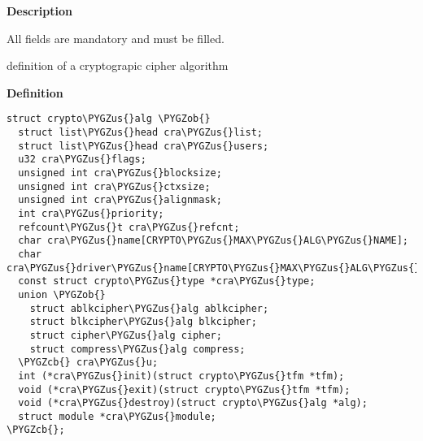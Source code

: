 \documentclass[a4paper,8pt,english]{sphinxmanual}
\def\PYGZus{\char`\_}
\def\PYGZob{\char`\{}
\def\PYGZcb{\char`\}}
\begin{document}
\textbf{Description}

All fields are mandatory and must be filled.

\begin{fulllineitems}
\label{crypto/api-skcipher:c.crypto_alg}
definition of a cryptograpic cipher algorithm

\end{fulllineitems}


\textbf{Definition}

\begin{Verbatim}[commandchars=\\\{\}]
struct crypto\PYGZus{}alg \PYGZob{}
  struct list\PYGZus{}head cra\PYGZus{}list;
  struct list\PYGZus{}head cra\PYGZus{}users;
  u32 cra\PYGZus{}flags;
  unsigned int cra\PYGZus{}blocksize;
  unsigned int cra\PYGZus{}ctxsize;
  unsigned int cra\PYGZus{}alignmask;
  int cra\PYGZus{}priority;
  refcount\PYGZus{}t cra\PYGZus{}refcnt;
  char cra\PYGZus{}name[CRYPTO\PYGZus{}MAX\PYGZus{}ALG\PYGZus{}NAME];
  char cra\PYGZus{}driver\PYGZus{}name[CRYPTO\PYGZus{}MAX\PYGZus{}ALG\PYGZus{}NAME];
  const struct crypto\PYGZus{}type *cra\PYGZus{}type;
  union \PYGZob{}
    struct ablkcipher\PYGZus{}alg ablkcipher;
    struct blkcipher\PYGZus{}alg blkcipher;
    struct cipher\PYGZus{}alg cipher;
    struct compress\PYGZus{}alg compress;
  \PYGZcb{} cra\PYGZus{}u;
  int (*cra\PYGZus{}init)(struct crypto\PYGZus{}tfm *tfm);
  void (*cra\PYGZus{}exit)(struct crypto\PYGZus{}tfm *tfm);
  void (*cra\PYGZus{}destroy)(struct crypto\PYGZus{}alg *alg);
  struct module *cra\PYGZus{}module;
\PYGZcb{};
\end{Verbatim}
\end{document}
